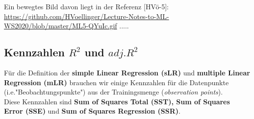 \documentclass[12pt]{article}
\begin{document}
Ein bewegtes Bild davon liegt in der Referenz [HVö-5]: 
\url{https://github.com/HVoellinger/Lecture-Notes-to-ML-WS2020/blob/master/ML5-QYuIc.gif}
.....\\


\subsection{Kennzahlen  $ R^2 $ und $ adj.{R^2} $ }
%
Für die Definition der \textbf{simple Linear Regression (sLR)} und \textbf{multiple Linear Regression (mLR)} brauchen wir einige Kennzahlen für die Datenpunkte (i.e."Beobachtungspunkte") aus der Trainingsmenge (\textit{observation points}).\\
Diese Kennzahlen sind \textbf{Sum of Squares Total (SST), Sum of Squares Error (SSE)} und \textbf{Sum of Squares Regression (SSR)}.\\[0.2cm]
%
\end{document}
